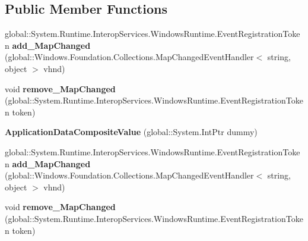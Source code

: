\subsection*{Public Member Functions}
\begin{DoxyCompactItemize}
\item 
\mbox{\label{class_windows_1_1_storage_1_1_application_data_composite_value_a1c91f78248cdfefd48dbb74e8c6cbcae}} 
global\+::\+System.\+Runtime.\+Interop\+Services.\+Windows\+Runtime.\+Event\+Registration\+Token {\bfseries add\+\_\+\+Map\+Changed} (global\+::\+Windows.\+Foundation.\+Collections.\+Map\+Changed\+Event\+Handler$<$ string, object $>$ vhnd)
\item 
\mbox{\label{class_windows_1_1_storage_1_1_application_data_composite_value_a38756e63852d3bb4fa2a5e28b2db18be}} 
void {\bfseries remove\+\_\+\+Map\+Changed} (global\+::\+System.\+Runtime.\+Interop\+Services.\+Windows\+Runtime.\+Event\+Registration\+Token token)
\item 
\mbox{\label{class_windows_1_1_storage_1_1_application_data_composite_value_a687a19ee159649de2153e9c15280a883}} 
{\bfseries Application\+Data\+Composite\+Value} (global\+::\+System.\+Int\+Ptr dummy)
\item 
\mbox{\label{class_windows_1_1_storage_1_1_application_data_composite_value_a1c91f78248cdfefd48dbb74e8c6cbcae}} 
global\+::\+System.\+Runtime.\+Interop\+Services.\+Windows\+Runtime.\+Event\+Registration\+Token {\bfseries add\+\_\+\+Map\+Changed} (global\+::\+Windows.\+Foundation.\+Collections.\+Map\+Changed\+Event\+Handler$<$ string, object $>$ vhnd)
\item 
\mbox{\label{class_windows_1_1_storage_1_1_application_data_composite_value_a38756e63852d3bb4fa2a5e28b2db18be}} 
void {\bfseries remove\+\_\+\+Map\+Changed} (global\+::\+System.\+Runtime.\+Interop\+Services.\+Windows\+Runtime.\+Event\+Registration\+Token token)
\item 
\mbox{\label{class_windows_1_1_storage_1_1_application_data_composite_value_a687a19ee159649de2153e9c15280a883}} 

\end{DoxyCompactItemize}
